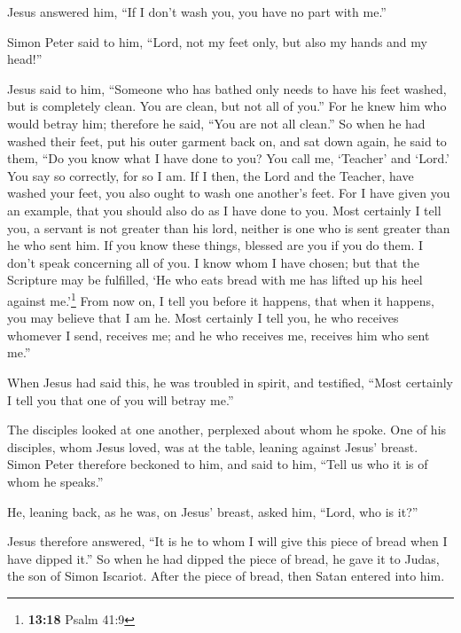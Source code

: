 Jesus answered him, ``If I don't wash you, you have no part with me.''

 Simon Peter said to him, ``Lord, not my feet only, but
also my hands and my head!''

 Jesus said to him, ``Someone who has bathed only needs
to have his feet washed, but is completely clean. You are clean, but not
all of you.''  For he knew him who would betray him;
therefore he said, ``You are not all clean.''  So when he
had washed their feet, put his outer garment back on, and sat down
again, he said to them, ``Do you know what I have done to you?
 You call me, `Teacher' and `Lord.' You say so correctly,
for so I am.  If I then, the Lord and the Teacher, have
washed your feet, you also ought to wash one another's feet.
 For I have given you an example, that you should also do
as I have done to you.  Most certainly I tell you, a
servant is not greater than his lord, neither is one who is sent greater
than he who sent him.  If you know these things, blessed
are you if you do them.  I don't speak concerning all of
you. I know whom I have chosen; but that the Scripture may be fulfilled,
`He who eats bread with me has lifted up his heel against
me.'\footnote{\textbf{13:18} Psalm 41:9}  From now on, I
tell you before it happens, that when it happens, you may believe that I
am he.  Most certainly I tell you, he who receives
whomever I send, receives me; and he who receives me, receives him who
sent me.''

 When Jesus had said this, he was troubled in spirit, and
testified, ``Most certainly I tell you that one of you will betray me.''

 The disciples looked at one another, perplexed about
whom he spoke.  One of his disciples, whom Jesus loved,
was at the table, leaning against Jesus' breast.  Simon
Peter therefore beckoned to him, and said to him, ``Tell us who it is of
whom he speaks.''

 He, leaning back, as he was, on Jesus' breast, asked
him, ``Lord, who is it?''

 Jesus therefore answered, ``It is he to whom I will give
this piece of bread when I have dipped it.'' So when he had dipped the
piece of bread, he gave it to Judas, the son of Simon Iscariot.
 After the piece of bread, then Satan entered into him.

